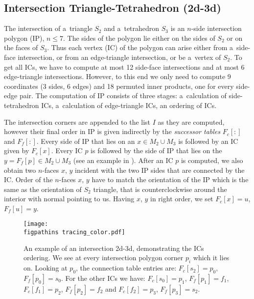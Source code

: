 \subsection{Intersection Triangle-Tetrahedron (2d-3d)}
The intersection of a~triangle $S_2$ and a~tetrahedron $S_3$ is an $n$-side intersection polygon (IP), $n\le 7$. The sides of the polygon
lie either on the sides of $S_2$ or on the faces of $S_3$. Thus each vertex (IC) of the polygon
can arise either from a~side-face intersection, or from an edge-triangle intersection, or be a~vertex of $S_2$.
To get all ICs, we have to compute at most 12 side-face intersections and at most 6 edge-triangle intersections. However,
to this end we only need to compute 9 \plucker coordinates (3 sides, 6 edges) and 18 permuted inner products, one for every side-edge pair.
The computation of IP consists of three stages: a~calculation of side-tetrahedron ICs, 
a~calculation of edge-triangle ICs, an ordering of ICs.


The intersection corners are appended to the list $I$ as they are computed, however their final order in IP is 
given indirectly by the \emph{successor tables} $F_c[:]$ and $F_f[:]$. Every side of IP that lies on an \nface $x\in M_2\cup M_3$ is followed by an 
IC given by $F_c[x]$. Every IC $p$ is followed by the side of IP that lies on the \nface $y=F_f[p]\in M_2\cup M_3$ (see an example in ).
After an IC $p$ is computed, we also obtain two $n$-faces $x$, $y$ incident with the two IP sides that are connected by the IC. 
Order of the $n$-faces $x$, $y$ have to match the orientation of the IP which is the same as the orientation of $S_2$ triangle, 
that is counterclockwise around the interior with normal pointing to us.
Having $x$, $y$ in right order, we set $F_c[x]=u$, $F_f[u]=y$.

\begin{figure}[!htb]
    \centering    
    \texttt{[image: \\figpathins tracing\_color.pdf]}
    \caption[Intersection 2d-3d example -- ICs ordering.]
    {An example of an intersection 2d-3d, demonstrating the ICs ordering. We see at every 
    intersection polygon corner $p_i$ which \nfaces it lies on. Looking at $p_0$, the connection table entries
    are: $F_c[s_2]=p_0$, $F_f[p_0]=s_0$. For the other ICs we have: $F_c[s_0]=p_1$, $F_f[p_1]=f_1$, $F_c[f_1]=p_2$, $F_f[p_2]=f_2$ and $F_c[f_2]=p_3$, $F_f[p_3]=s_2$.}
    \label{fig:tracing}
\end{figure}

